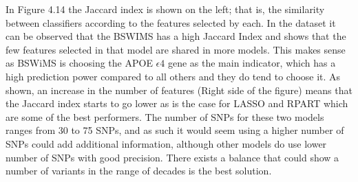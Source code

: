 In Figure 4.14 the Jaccard index is shown on the left; that is, the similarity between classifiers according to the features selected by each. In the dataset it can be observed that the BSWIMS has a high Jaccard Index and shows that the few features selected in that model are shared in more models. This makes sense as BSWiMS is choosing the APOE $\epsilon4$ gene as the main indicator, which has a high prediction power compared to all others and they do tend to choose it. As shown, an increase in the number of features (Right side of the figure) means that the Jaccard index starts to go lower as is the case for LASSO and RPART which are some of the best performers. The number of SNPs for these two models ranges from 30 to 75 SNPs, and as such it would seem using a higher number of SNPs could add additional information, although other models do use lower number of SNPs with good precision. There exists a balance that could show a number of variants in the range of decades is the best solution.

